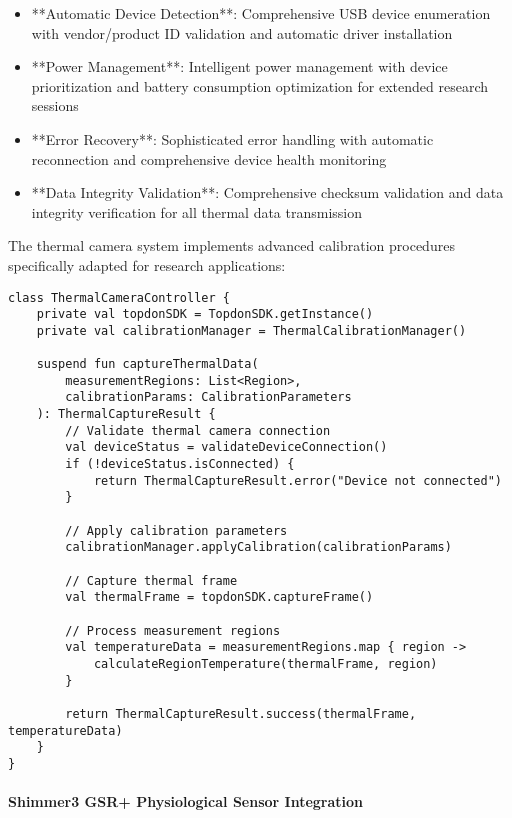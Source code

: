 \documentclass[12pt,a4paper]{article}
\begin{document}
\begin{itemize}
\item **Automatic Device Detection**: Comprehensive USB device enumeration with vendor/product ID validation and automatic
  driver installation
\item **Power Management**: Intelligent power management with device prioritization and battery consumption optimization for
  extended research sessions
\item **Error Recovery**: Sophisticated error handling with automatic reconnection and comprehensive device health
  monitoring
\item **Data Integrity Validation**: Comprehensive checksum validation and data integrity verification for all thermal data
  transmission

\end{itemize}
The thermal camera system implements advanced calibration procedures specifically adapted for research applications:

\begin{verbatim}
class ThermalCameraController {
    private val topdonSDK = TopdonSDK.getInstance()
    private val calibrationManager = ThermalCalibrationManager()

    suspend fun captureThermalData(
        measurementRegions: List<Region>,
        calibrationParams: CalibrationParameters
    ): ThermalCaptureResult {
        // Validate thermal camera connection
        val deviceStatus = validateDeviceConnection()
        if (!deviceStatus.isConnected) {
            return ThermalCaptureResult.error("Device not connected")
        }

        // Apply calibration parameters
        calibrationManager.applyCalibration(calibrationParams)

        // Capture thermal frame
        val thermalFrame = topdonSDK.captureFrame()

        // Process measurement regions
        val temperatureData = measurementRegions.map { region ->
            calculateRegionTemperature(thermalFrame, region)
        }

        return ThermalCaptureResult.success(thermalFrame, temperatureData)
    }
}
\end{verbatim}

\paragraph{Shimmer3 GSR+ Physiological Sensor Integration}
\end{document}
